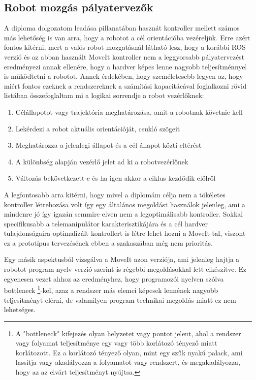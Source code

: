 \subsection{Robot mozgás pályatervezők}

A diploma dolgozatom leadása pillanatában hasznát kontroller mellett számos más lehetőség is van arra, hogy a robotot a cél orientációba vezéreljük. Erre azért fontos kitérni, mert a valós robot mozgatásnál látható lesz, hogy a korábbi ROS verzió és az abban használt MoveIt kontroller nem a leggyorsabb pályatervezést eredményezi annak ellenére, hogy a hardver képes lenne nagyobb teljesítménnyel is működtetni a robotot. Annek érdekében, hogy személetesebb legyen az, hogy miért fontos ezeknek a rendszereknek a számítási kapacitácával foglalkozni rövid listában összefoglaltam mi a logikai sorrendje a robot vezérlőknek:

\begin{enumerate}
\item Célállapotot vagy trajektória meghatározása, amit a robotnak követnie kell
\item Lekérdezi a robot aktuális orientációját, csukló szögeit
\item Meghatározza a jelenlegi állapot és a cél állapot közti eltérést
\item A különbség alapján vezérlő jelet ad ki a robotvezérlőnek
\item Változás bekövetkezett-e és ha igen akkor a ciklus kezdődik elölről
\end{enumerate}

A legfontosabb arra kitérni, hogy mivel a diplomám célja nem a tökéletes kontroller létrehozása volt így egy általános megoldást használok jelenleg, ami a mindenre jó így igazán semmire elven nem a legoptimálisabb kontroller. Sokkal specifikusabb a telemanipulátor karakterisztikájára és a cél hardver tulajdonságaira optimalizált kontrollert is létre lehet hozni a MoveIt-tal, viszont ez a prototípus tervezésének ebben a szakaszában még nem prioritás.

Egy másik aspektusból vizsgálva a MoveIt azon verziója, ami jelenleg hajtja a robotot program nyelv verzió szerint is régebbi megoldásokkal lett elkészítve. Ez egyenesen vezet ahhoz az eredményhez, hogy programozói nyelven szólva bottleneck \footnote{A "bottleneck" kifejezés olyan helyzetet vagy pontot jelent, ahol a rendszer vagy folyamat teljesítménye egy vagy több korlátozó tényező miatt korlátozott. Ez a korlátozó tényező olyan, mint egy szűk nyakú palack, ami lassítja vagy akadályozza a folyamatot vagy rendszert, és megakadályozza, hogy az az elvárt teljesítményt nyújtsa.}-kel, azaz a rendszer más elemei képesek lennének nagyobb teljesítményt elérni, de valamilyen program technikai megoldás miatt ez nem lehetséges.

